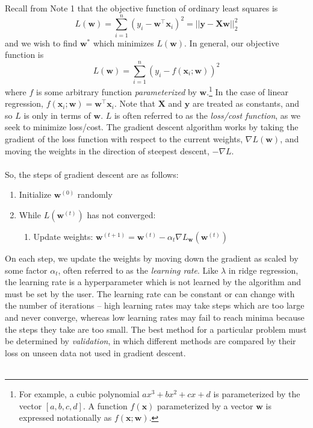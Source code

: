 \documentclass{article}
\begin{document}
Recall from Note 1 that the objective function of ordinary least squares is $$L(\mathbf{w}) = \sum\limits_{i=1}^n (y_i - \mathbf{w^{\top}x}_i)^2 = ||\mathbf{y - Xw}||_2^2$$ and we wish to find $\mathbf{w^*}$ which minimizes $L(\mathbf{w})$. In general, our objective function is $$L(\mathbf{w}) = \sum\limits_{i=1}^n (y_i - f(\mathbf{x}_i;\mathbf{w}))^2$$ where $f$ is some arbitrary function \textit{parameterized} by $\mathbf{w}$.\footnote{For example, a cubic polynomial $ax^3 + bx^2 + cx + d$ is parameterized by the vector $[a, b, c, d]$. A function $f(\mathbf{x})$ parameterized by a vector $\mathbf{w}$ is expressed notationally as $f(\mathbf{x};\mathbf{w})$.} In the case of linear regression, $f(\mathbf{x}_i; \mathbf{w}) = \mathbf{w^{\top}x}_i$. Note that $\mathbf{X}$ and $\mathbf{y}$ are treated as constants, and so $L$ is only in terms of $\mathbf{w}$. $L$ is often referred to as the \textit{loss/cost function}, as we seek to minimize loss/cost. The gradient descent algorithm works by taking the gradient of the loss function with respect to the current weights, $\nabla L(\mathbf{w})$, and moving the weights in the direction of steepest descent, $-\nabla L$. \\\\
So, the steps of gradient descent are as follows:
\begin{enumerate}[label=\arabic*.]
\item Initialize $\mathbf{w}^{(0)}$ randomly
\item While $L(\mathbf{w}^{(t)})$ has not converged:
		 \begin{enumerate}[label=(\alph*)]
		 \item Update weights: $\mathbf{w}^{(t+1)} = \mathbf{w}^{(t)} - \alpha_t\nabla L_{\mathbf{w}}(\mathbf{w}^{(t)})$
		 \end{enumerate}
\end{enumerate}
On each step, we update the weights by moving down the gradient as scaled by some factor $\alpha_t$, often referred to as the \textit{learning rate}. Like $\lambda$ in ridge regression, the learning rate is a hyperparameter which is not learned by the algorithm and must be set by the user. The learning rate can be constant or can change with the number of iterations -- high learning rates may take steps which are too large and never converge, whereas low learning rates may fail to reach minima because the steps they take are too small. The best method for a particular problem must be determined by \textit{validation}, in which different methods are compared by their loss on unseen data not used in gradient descent. \\\\
\end{document}
